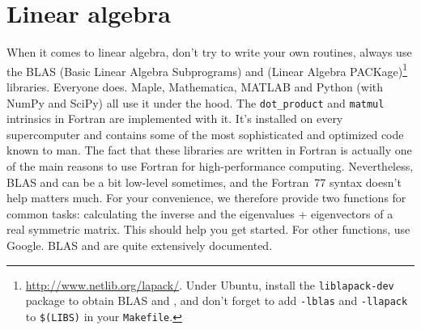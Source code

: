 \chapter{Linear algebra}
\label{chap:Linear algebra}

When it comes to linear algebra, don't try to write your own routines, always use the BLAS (Basic Linear Algebra Subprograms) and  (Linear Algebra PACKage)\footnote{\url{http://www.netlib.org/lapack/}.
Under Ubuntu, install the \texttt{liblapack-dev} package to obtain BLAS and , and don't forget to add \texttt{-lblas} and \texttt{-llapack} to \texttt{\$(LIBS)} in your \texttt{Makefile}.} libraries.
Everyone does.
Maple, Mathematica, MATLAB and Python (with NumPy and SciPy) all use it under the hood.
The \texttt{dot\_product} and \texttt{matmul} intrinsics in Fortran are implemented with it.
It's installed on every supercomputer and contains some of the most sophisticated and optimized code known to man.
The fact that these libraries are written in Fortran is actually one of the main reasons to use Fortran for high-performance computing.
Nevertheless, BLAS and  can be a bit low-level sometimes, and the Fortran~77 syntax doesn't help matters much.
For your convenience, we therefore provide two functions for common tasks: calculating the inverse and the eigenvalues + eigenvectors of a real symmetric matrix.
This should help you get started.
For other functions, use Google.
BLAS and  are quite extensively documented.




